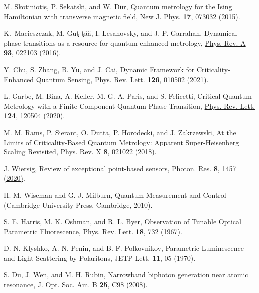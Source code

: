 \documentclass[twocolumn,prl,floatfix,citeautoscript,nofootinbib,superscriptaddress]{revtex4}
\begin{document}
\begin{thebibliography}{99}
 M. Skotiniotis, P. Sekatski, and W. D\"ur, Quantum
metrology for the Ising Hamiltonian with transverse magnetic field, \href{https://doi.org/10.1088/1367-2630/17/7/073032}%
{New J. Phys. \textbf{17}, 073032 (2015)}.

 K.~Macieszczak, M. Gu\ifmmode \mbox{\c{t}}%
\else
\c{t}\fi{}\ifmmode \u{a}\else \u{a}\fi{}, I. Lesanovsky, and J. P. Garrahan,
Dynamical phase transitions as a resource for quantum enhanced metrology,
\href{https://doi.org/10.1103/PhysRevA.93.022103}{Phys. Rev. A \textbf{93},
022103 (2016)}.

 Y. Chu, S. Zhang, B. Yu, and J. Cai,
Dynamic Framework for Criticality-Enhanced Quantum Sensing, \href{https://doi.org/10.1103/PhysRevLett.126.010502}%
{Phys. Rev. Lett. \textbf{126}, 010502 (2021)}.

 L. Garbe, M. Bina, A. Keller, M. G. A.
Paris, and S. Felicetti, Critical Quantum Metrology with a Finite-Component
Quantum Phase Transition, \href{https://doi.org/10.1103/PhysRevLett.124.120504}%
{Phys. Rev. Lett. \textbf{124}, 120504 (2020)}.

 M. M. Rams, P. Sierant, O. Dutta, P. Horodecki,
and J. Zakrzewski, At the Limits of Criticality-Based Quantum Metrology:
Apparent Super-Heisenberg Scaling Revisited, \href{https://doi.org/10.1103/PhysRevX.8.021022}%
{Phys. Rev. X \textbf{8}, 021022 (2018)}.

 J. Wiersig, Review of exceptional point-based sensors,
\href{https://doi.org/10.1364/PRJ.396115}{Photon. Res. \textbf{8}, 1457
(2020)}.

 H. M. Wiseman and G. J. Milburn, Quantum
Measurement and Control (Cambridge University Press, Cambridge, 2010).


 S. E. Harris, M. K. Oshman, and R. L. Byer, Observation of
Tunable Optical Parametric Fluorescence, \href{https://doi.org/10.1103/PhysRevLett.18.732}%
{Phys. Rev. Lett. \textbf{18}, 732 (1967)}.

 D. N. Klyshko, A. N. Penin, and B. F. Polkovnikov,
Parametric Luminescence and Light Scattering by Polaritons, JETP Lett.
\textbf{11}, 05 (1970).

 S. Du, J. Wen, and M. H. Rubin, Narrowband biphoton
generation near atomic resonance, \href{https://doi.org/10.1364/JOSAB.25.000C98}%
{J. Opt. Soc. Am. B \textbf{25}, C98 (2008)}.


\end{thebibliography}
\end{document}
